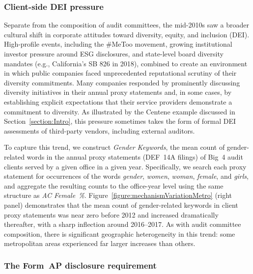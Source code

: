 \documentclass[11pt]{article}
\begin{document}
        \subsubsection{Client-side DEI pressure}\label{section:deiPressure}

            Separate from the composition of audit committees, the mid-2010s saw a broader cultural shift in corporate attitudes toward diversity, equity, and inclusion (DEI). High-profile events, including the \#MeToo movement, growing institutional investor pressure around ESG disclosures, and state-level board diversity mandates (e.g., California's SB 826 in 2018), combined to create an environment in which public companies faced unprecedented reputational scrutiny of their diversity commitments. Many companies responded by prominently discussing diversity initiatives in their annual proxy statements and, in some cases, by establishing explicit expectations that their service providers demonstrate a commitment to diversity. As illustrated by the Centene example discussed in Section~\ref{section:Intro}, this pressure sometimes takes the form of formal DEI assessments of third-party vendors, including external auditors.

            To capture this trend, we construct \textit{Gender Keywords}, the mean count of gender-related words in the annual proxy statements (DEF~14A filings) of Big~4 audit clients served by a given office in a given year. Specifically, we search each proxy statement for occurrences of the words \textit{gender}, \textit{women}, \textit{woman}, \textit{female}, and \textit{girls}, and aggregate the resulting counts to the office-year level using the same structure as \textit{AC Female~\%}. Figure~\ref{figure:mechanismVariationMetro} (right panel) demonstrates that the mean count of gender-related keywords in client proxy statements was near zero before 2012 and increased dramatically thereafter, with a sharp inflection around 2016--2017. As with audit committee composition, there is significant geographic heterogeneity in this trend: some metropolitan areas experienced far larger increases than others.

        \subsubsection{The Form~AP disclosure requirement}\label{section:formAPhistory}
\end{document}
